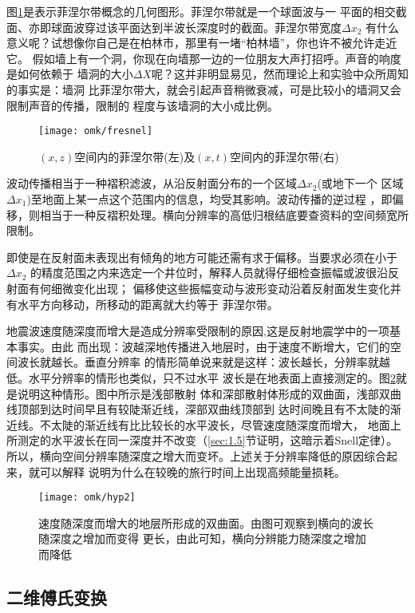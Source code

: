 图\ref{fig:omk/fresnel}是表示菲涅尔带概念的几何图形。菲涅尔带就是一个球面波与一
平面的相交截面、亦即球面波穿过该平面达到半波长深度时的截面。菲涅尔带宽度$\Delta x_{2}$
有什么意义呢？试想像你自己是在柏林市，那里有一堵“柏林墙”，你也许不被允许走近它。
假如墙上有一个洞，你现在向墙那一边的一位朋友大声打招呼。声音的响度是如何依赖于
墙洞的大小$\Delta X$呢？这并非明显易见，然而理论上和实验中众所周知的事实是：墙洞
比菲涅尔带大，就会引起声音稍微衰减，可是比较小的墙洞又会限制声音的传播，限制的
程度与该墙洞的大小成比例。
\begin{figure}[H]
\centering
\texttt{[image: omk/fresnel]}
\caption[fresnel]{$(x,z)$空间内的菲涅尔带(左)及$(x,t)$空间内的菲涅尔带(右)}
\label{fig:omk/fresnel}
\end{figure}

波动传播相当于一种褶积滤波，从沿反射面分布的一个区域$\Delta x_{2}$(或地下一个
区域$\Delta x_{1}$)至地面上某一点这个范围内的信息，均受其影响。波动传播的逆过程
，即偏移，则相当于一种反褶积处理。横向分辨率的高低归根结底要查资料的空间频宽所限制。

即使是在反射面未表现出有倾角的地方可能还需有求于偏移。当要求必须在小于$\Delta x_{2}$
的精度范围之内来选定一个井位时，解释人员就得仔细检查振幅或波很沿反射面有何细微变化出现；
偏移使这些振幅变动与波形变动沿着反射面发生变化并有水平方向移动，所移动的距离就大约等于
菲涅尔带。

地震波速度随深度而增大是造成分辨率受限制的原因,这是反射地震学中的一项基本事实。由此
而出现：波越深地传播进入地层时，由于速度不断增大，它们的空间波长就越长。垂直分辨率
的情形简单说来就是这样：波长越长，分辨率就越低。水平分辨率的情形也类似，只不过水平
波长是在地表面上直接测定的。图\ref{fig:omk/hyp2}就是说明这种情形。图中所示是浅部散射
体和深部散射体形成的双曲面，浅部双曲线顶部到达时间早且有较陡渐近线，深部双曲线顶部到
达时间晚且有不太陡的渐近线。不太陡的渐近线有比比较长的水平波长，尽管速度随深度而增大，
地面上所测定的水平波长在同一深度并不改变（\ref{sec:1.5}节证明，这暗示着Snell定律）。
所以，横向空间分辨率随深度之增大而变坏。上述关于分辨率降低的原因综合起来，就可以解释
说明为什么在较晚的旅行时间上出现高频能量损耗。

\begin{figure}[H]
\centering
\texttt{[image: omk/hyp2]}
\caption[hyp2]{速度随深度而增大的地层所形成的双曲面。由图可观察到横向的波长随深度之增加而变得
更长，由此可知，横向分辨能力随深度之增加而降低}
\label{fig:omk/hyp2}
\end{figure}

\subsection{二维傅氏变换}
\label{sec:1.2.4}

